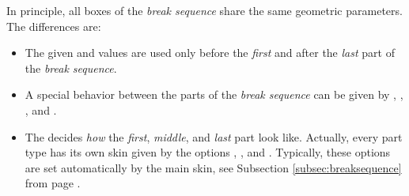 \clearpage
In principle, all boxes of the \emph{break sequence} share the same geometric
parameters. The differences are:
\begin{itemize}
\item The given  and  values are
  used only before the \emph{first} and after the \emph{last} part
  of the \emph{break sequence}.
\item A special behavior between the parts of the \emph{break sequence} can
  be given by ,
  ,
  , and
  .
\item The  decides \emph{how} the \emph{first}, \emph{middle},
  and \emph{last} part look like. Actually, every part type has its own
  skin given by the options  , , and
  . Typically, these options are set automatically by
  the main skin, see Subsection \ref{subsec:breaksequence} from
  page \pageref{subsec:breaksequence}.
\end{itemize}


